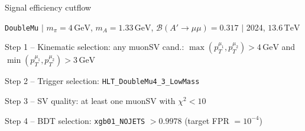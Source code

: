 \documentclass[10pt,a4paper]{article}
\begin{document}
{\large Signal efficiency cutflow

 \texttt{DoubleMu} $|$ $m_{\pi}=4\,\mathrm{GeV}$, $m_{A}=1.33\,\mathrm{GeV}$, $\mathcal{B}(A'\!\to\!\mu\mu)=0.317$ $|$ 2024, $13.6\,\mathrm{TeV}$}

\vspace{0.8em}

Step 1 -- Kinematic selection: any muonSV cand.: $\max(p_T^{\mu_1},p_T^{\mu_2}){>}4\,\mathrm{GeV}$ and $\min(p_T^{\mu_1},p_T^{\mu_2}){>}3\,\mathrm{GeV}$

Step 2 -- Trigger selection: \texttt{HLT\_DoubleMu4\_3\_LowMass}

Step 3 -- SV quality: at least one muonSV with $\chi^2<10$

Step 4 -- BDT selection: \texttt{xgb01\_NOJETS} $>0.9978$ (target FPR $=10^{-4}$)

\vspace{0.8em}
\end{document}
